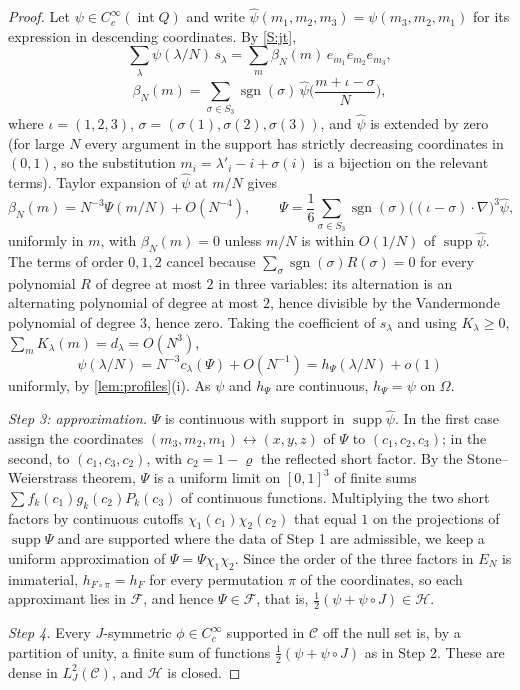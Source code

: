 \documentclass[11pt,colorlinks]{charlie}
\newcommand{\Om}{\Omega}
\begin{document}
\begin{proof}
Let $\psi\in C_c^\infty(\operatorname{int}Q)$ and write $\hat\psi(m_1,m_2,m_3)=\psi(m_3,m_2,m_1)$ for its expression in descending coordinates. By \ref{S:jt},
\[
 \sum_{\lambda}\psi(\lambda/N)\,s_\lambda=\sum_{m}\beta_N(m)\,e_{m_1}e_{m_2}e_{m_3},\]\[ \beta_N(m)=\sum_{\sigma\in S_3}\operatorname{sgn}(\sigma)\,\hat\psi\Big(\frac{m+\iota-\sigma}{N}\Big),
\]
where $\iota=(1,2,3)$, $\sigma=(\sigma(1),\sigma(2),\sigma(3))$, and $\hat\psi$ is extended by zero (for large $N$ every argument in the support has strictly decreasing coordinates in $(0,1)$, so the substitution $m_i=\lambda'_i-i+\sigma(i)$ is a bijection on the relevant terms). Taylor expansion of $\hat\psi$ at $m/N$ gives
\[
 \beta_N(m)=N^{-3}\Psi(m/N)+O(N^{-4}),\qquad \Psi=\frac16\sum_{\sigma\in S_3}\operatorname{sgn}(\sigma)\big((\iota-\sigma)\cdot\nabla\big)^3\hat\psi,
\]
uniformly in $m$, with $\beta_N(m)=0$ unless $m/N$ is within $O(1/N)$ of $\operatorname{supp}\hat\psi$. The terms of order $0,1,2$ cancel because $\sum_\sigma\operatorname{sgn}(\sigma)R(\sigma)=0$ for every polynomial $R$ of degree at most $2$ in three variables: its alternation is an alternating polynomial of degree at most $2$, hence divisible by the Vandermonde polynomial of degree $3$, hence zero. Taking the coefficient of $s_\lambda$ and using $K_\lambda\ge0$, $\sum_mK_\lambda(m)=d_\lambda=O(N^3)$,
\[
 \psi(\lambda/N)=N^{-3}c_\lambda(\Psi)+O(N^{-1})=h_\Psi(\lambda/N)+o(1)
\]
uniformly, by \cref{lem:profiles}(i). As $\psi$ and $h_\Psi$ are continuous, $h_\Psi=\psi$ on $\Om$.

\emph{Step 3: approximation.} $\Psi$ is continuous with support in $\operatorname{supp}\hat\psi$. In the first case assign the coordinates $(m_3,m_2,m_1)\leftrightarrow(x,y,z)$ of $\Psi$ to $(c_1,c_2,c_3)$; in the second, to $(c_1,c_3,c_2)$, with $c_2=1-\varrho$ the reflected short factor. By the Stone--Weierstrass theorem, $\Psi$ is a uniform limit on $[0,1]^3$ of finite sums $\sum f_k(c_1)g_k(c_2)P_k(c_3)$ of continuous functions. Multiplying the two short factors by continuous cutoffs $\chi_1(c_1)\chi_2(c_2)$ that equal $1$ on the projections of $\operatorname{supp}\Psi$ and are supported where the data of Step 1 are admissible, we keep a uniform approximation of $\Psi=\Psi\chi_1\chi_2$. Since the order of the three factors in $E_N$ is immaterial, $h_{F\circ\pi}=h_F$ for every permutation $\pi$ of the coordinates, so each approximant lies in $\mathcal F$, and hence $\Psi\in\mathcal F$, that is, $\frac12(\psi+\psi\circ J)\in\mathcal H$.

\emph{Step 4.} Every $J$-symmetric $\phi\in C_c^\infty$ supported in $\mathcal C$ off the null set is, by a partition of unity, a finite sum of functions $\frac12(\psi+\psi\circ J)$ as in Step 2. These are dense in $L^2_J(\mathcal C)$, and $\mathcal H$ is closed.
\end{proof}
\end{document}
